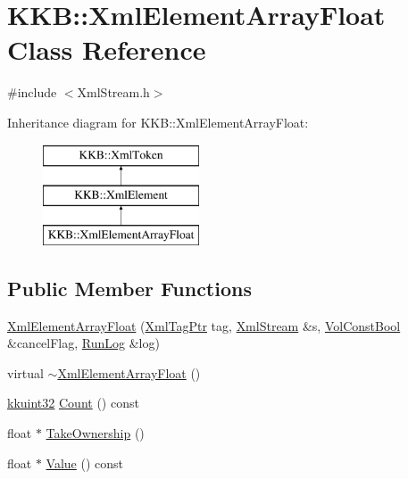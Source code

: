 \hypertarget{class_k_k_b_1_1_xml_element_array_float}{}\section{K\+KB\+:\+:Xml\+Element\+Array\+Float Class Reference}
\label{class_k_k_b_1_1_xml_element_array_float}


{\ttfamily \#include $<$Xml\+Stream.\+h$>$}

Inheritance diagram for K\+KB\+:\+:Xml\+Element\+Array\+Float\+:\begin{figure}[H]
\begin{center}
\leavevmode
\includegraphics[height=3.000000cm]{class_k_k_b_1_1_xml_element_array_float}
\end{center}
\end{figure}
\subsection*{Public Member Functions}
\begin{DoxyCompactItemize}
\item 
\hyperlink{class_k_k_b_1_1_xml_element_array_float_ad3f2214f571f775eaecd7c6dcb86c333}{Xml\+Element\+Array\+Float} (\hyperlink{namespace_k_k_b_a9253a3ea8a5da18ca82be4ca2b390ef0}{Xml\+Tag\+Ptr} tag, \hyperlink{class_k_k_b_1_1_xml_stream}{Xml\+Stream} \&s, \hyperlink{namespace_k_k_b_a7d390f568e2831fb76b86b56c87bf92f}{Vol\+Const\+Bool} \&cancel\+Flag, \hyperlink{class_k_k_b_1_1_run_log}{Run\+Log} \&log)
\item 
virtual \hyperlink{class_k_k_b_1_1_xml_element_array_float_ab570b157bad51b22e57f3f03dc0fcd9e}{$\sim$\+Xml\+Element\+Array\+Float} ()
\item 
\hyperlink{namespace_k_k_b_af8d832f05c54994a1cce25bd5743e19a}{kkuint32} \hyperlink{class_k_k_b_1_1_xml_element_array_float_a364bdaf1cdc0dc775e30957350fc6504}{Count} () const 
\item 
float $\ast$ \hyperlink{class_k_k_b_1_1_xml_element_array_float_a43d247c7374f56ef9e6e1d3ccec40809}{Take\+Ownership} ()
\item 
float $\ast$ \hyperlink{class_k_k_b_1_1_xml_element_array_float_af18257639ce9fb8f4bf60f3b3743b153}{Value} () const 
\end{DoxyCompactItemize}
